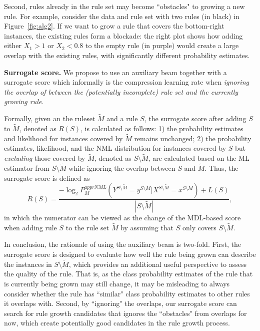 Second, rules already in the rule set may become ``obstacles" to growing a new rule. For example, consider the data and rule set with two rules (in black) in Figure~\ref{fig:alg2}. If we want to grow a rule that covers the bottom-right instances, the existing rules form a blockade: the right plot shows how adding either $X_1 > 1$ or $X_2 < 0.8$ to the empty rule (in purple) would create a large overlap with the existing rules, with significantly different probability estimates.

\noindent \textbf{Surrogate score.}
We propose to use an auxiliary beam together with a surrogate score which informally is the compression learning rate when \emph{ignoring the overlap of between the (potentially incomplete) rule set and the currently growing rule}. 

Formally, given an the ruleset $\tilde{M}$ and a rule $S$, the surrogate score after adding $S$ to $\tilde{M}$, denoted as $R(S)$, is calculated as follows: 1) the probability estimates and likelihood for instances covered by $\tilde{M}$ remains unchanged; 2) the probability estimates, likelihood, and the NML distribution for instances covered by $S$ but \emph{excluding} those covered by $\tilde{M}$, denoted as $S \setminus \tilde{M}$, are calculated based on the ML estimator from $S \setminus \tilde{M}$ while ignoring the overlap between $S$ and $\tilde{M}$. Thus, the surrogate score is defined as 
\begin{equation} \label{eq:surrogate_learning_rate}
	R(S) = \frac{-\log_2 P_M^{apprNML}(Y^{S \setminus \tilde{M}} = y^{S \setminus \tilde{M}} | X^{S \setminus \tilde{M}} = x^{S \setminus \tilde{M}}) + L(S)} {|S \setminus \tilde{M}|},
\end{equation}
in which the numerator can be viewed as the change of the MDL-based score when adding rule $S$ to the rule set $\tilde{M}$ by assuming that $S$ only covers $S \setminus \tilde{M}$. 

In conclusion, the rationale of using the auxiliary beam is two-fold. First, the surrogate score is designed to evaluate how well the rule being grown can describe the instances in $S \setminus \tilde{M}$, which provides an additional useful perspective to assess the quality of the rule. That is, as the class probability estimates of the rule that is currently being grown may still change, it may be misleading to always consider whether the rule has ``similar" class probability estimates to other rules it overlaps with. Second, by ``ignoring" the overlaps, our surrogate score can search for rule growth candidates that ignores the ``obstacles" from overlaps for now, which create potentially good candidates in the rule growth process. 

